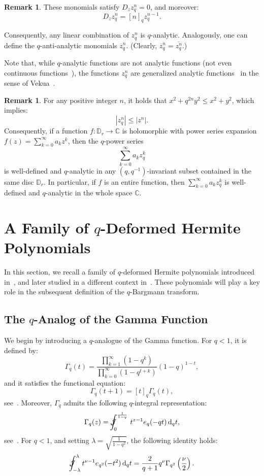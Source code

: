 \documentclass[10pt]{amsart}
\theoremstyle{plain}
\theoremstyle{definition}
\newtheorem{remark}[theorem]{Remark}
\renewcommand{\bar}[1]{\overline{#1}}
\newcommand{\Jint}{\mathcal{J}\mspace{-20mu}\int  }
\begin{document}
\begin{remark}
These monomials satisfy $ D_{\bar{z}} z_q^n = 0 $, and moreover:
\[
D_z z_q^n = [n]_q z_q^{n-1}.
\]
\end{remark}

Consequently, any linear combination of $z_q^n$ is $q$-analytic.
Analogously, one can define the $q$-anti-analytic monomials $\overline{z}_q^n$. (Clearly, $\overline{z}_q^n = \overline{z_q^n}$.) 

Note that, while $q$-analytic functions are not analytic functions (not even continuous functions~\cite{Am,BAZ}), the functions $z_{q}^{n}$ are generalized analytic functions~\cite{Pashaev2014} in the sense of Vekua~\cite{Vekua1962}.

\begin{remark}\label{remnorm}
For any positive integer $n$, it holds that $x^2 + q^{2n}y^2 \leq x^2 + y^2$, which implies:
\[
|z_q^n| \leq |z^n|.
\]
Consequently, if a function $f : \mathbb{D}_r \to \mathbb{C}$ is holomorphic with power series expansion $f(z) = \sum_{k=0}^\infty a_k z^k$, then the $q$-power series
\[
\sum_{k=0}^\infty a_k z_q^k
\]
is well-defined and $q$-analytic in any $(q,q^{-1})$-invariant subset contained in the same disc $\mathbb{D}_r$. In particular, if $f$ is an entire function, then $\sum_{k=0}^\infty a_k z_q^k$ is
well-defined and $q$-analytic in the whole space $\mathbb{C}$.
\end{remark}



\section{A Family of $q$-Deformed Hermite Polynomials}\label{secHerm}
In this section, we recall a family of $q$-deformed Hermite polynomials introduced in~\cite{Exton1980}, and later studied in a different context in~\cite{CoSo2010}. These polynomials will play a key role in the subsequent definition of the $q$-Bargmann transform.

\subsection{The $q$-Analog of the Gamma Function}

We begin by introducing a $q$-analogue of the Gamma function. For $q < 1$, it is defined by:
\[
\Gamma_q(t) = \frac{\prod_{k=1}^{\infty}(1 - q^k)}{\prod_{k=0}^{\infty}(1 - q^{t+k})}(1 - q)^{1 - t},
\]
and it satisfies the functional equation:
\[
\Gamma_q(t + 1) = [t]_q \Gamma_q(t),
\]
see~\cite{Gasper2009}.
Moreover, $\Gamma_q$ admits the following $q$-integral representation:
\[
\Gamma_q(z) = \Jint_0^{\frac{1}{1 - q}}  \, t^{z - 1} e_q(-q t)\,\mathrm{d}_q t,
\]
see~\cite{Exton1983, Floreanini1991}.
For $q < 1$, and setting $ \lambda = \sqrt{\frac{1}{1 - q^2}} $, the following identity holds:
\[
\Jint_{-\lambda}^{\lambda} t^{\nu - 1} e_{q^{2}}(-t^2) \,\mathrm{d}_q t
= \frac{2}{q + 1} q^{\nu} \Gamma_{q^{2}}\left( \frac{\nu}{2} \right).
\]
\end{document}
